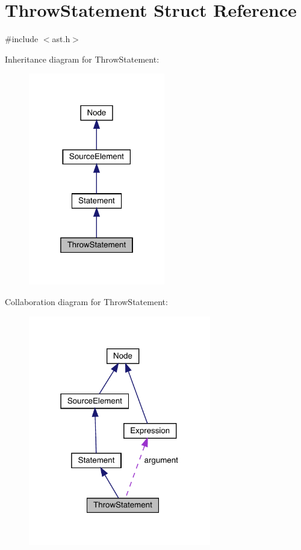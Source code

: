 \hypertarget{struct_throw_statement}{}\section{Throw\+Statement Struct Reference}
\label{struct_throw_statement}


{\ttfamily \#include $<$ast.\+h$>$}



Inheritance diagram for Throw\+Statement\+:\nopagebreak
\begin{figure}[H]
\begin{center}
\leavevmode
\includegraphics[width=169pt]{struct_throw_statement__inherit__graph}
\end{center}
\end{figure}


Collaboration diagram for Throw\+Statement\+:\nopagebreak
\begin{figure}[H]
\begin{center}
\leavevmode
\includegraphics[width=226pt]{struct_throw_statement__coll__graph}
\end{center}
\end{figure}
